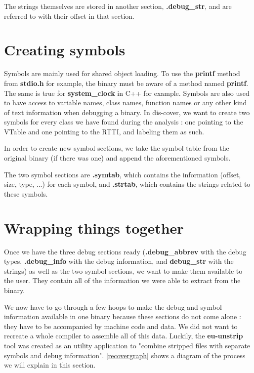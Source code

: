 \documentclass[a4paper,11pt,oneside]{report}
\begin{document}
The strings themselves are stored in another section, \textbf{.debug\_str}, and 
are referred to with their offset in that section.

\section{Creating symbols}

Symbols are mainly used for shared object loading. To use the \textbf{printf}
method from \textbf{stdio.h} for example, the binary must be aware of a
method named \textbf{printf}. The same is true for
\textbf{system\_clock} in C++ for example.
Symbols are also used to have access to variable names, class names, function
names or any other kind of text information when debugging a binary.
In dis-cover, we want to create two symbols for every class we have found
during the analysis : one pointing to the VTable and one pointing to the RTTI,
and labeling them as such.

In order to create new symbol sections, we take the symbol table from the 
original binary (if there was one) and append the aforementioned symbols.

The two symbol sections are \textbf{.symtab}, which contains the information 
(offset, size, type, ...) for each symbol, and \textbf{.strtab}, which contains 
the strings related to these symbols.

\section{Wrapping things together}
\label{wrappingimplementation}

Once we have the three debug sections ready
(\textbf{.debug\_abbrev} with the debug types, \textbf{.debug\_info} with the 
debug information, and \textbf{debug\_str} with the strings)
as well as the two symbol sections, we want to make them available to the user.
They contain all of the information we were able to extract from the binary.

We now have to go through a few hoops to make the debug and symbol information
available in one binary because these sections do not come alone : they have to
be accompanied by machine code and data.
We did not want to recreate a whole compiler to assemble all of this data.
Luckily, the \textbf{eu-unstrip} tool was created as an utility application
to "combine stripped files with separate symbols and debug information".
\autoref{recovergraph} shows a diagram of the process we will explain in this
section.
\end{document}

